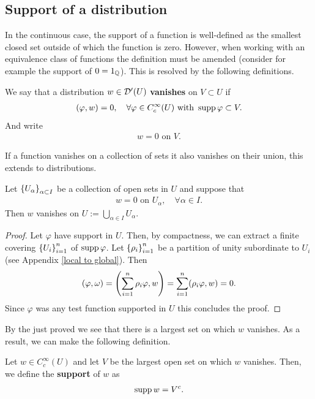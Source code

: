 \documentclass[
    a4paper,
    DIV=14,
    abstract=true,
    numbers=noenddot
]{scrartcl}
\begin{document}
\subsection{Support of a distribution}\label{support sec}
In the continuous case, the support of a function is well-defined as the smallest closed set outside of which the function is zero. However, when working with an equivalence class of functions the definition must be amended (consider for example the support of $0=1_{\mathbb{Q}}$). This is resolved by the following definitions.
\begin{definition} We say that a distribution $w \in \mathcal{D}'(U)$ \textbf{vanishes} on $V \subset U$ if
	\begin{align*}
		(\varphi, w)=0 , \quad\forall \varphi \in C_c^\infty(U) \text{ with } \operatorname{supp}{\varphi} \subset V  .
	\end{align*}
	And write
	\begin{align*}
		w =0 \text{ on } V.
	\end{align*}

\end{definition}
If a function vanishes on a collection of sets it also vanishes on their union, this extends to distributions.
\begin{lemma}\label{biggest vanish}
	Let  $\left\{U_\alpha\right\}_{\alpha \subset I} $ be a collection of open sets in $U$ and suppose that
	\begin{align*}
		w=0 \text{ on  } U_\alpha , \quad\forall \alpha \in I.
	\end{align*}
	Then $w$ vanishes on  $U:=\bigcup_{\alpha \in  I}U_\alpha$.
\end{lemma}
\begin{proof}
	Let $\varphi$ have support in $U$. Then,     by compactness, we can extract a finite covering $\left\{U_i\right\}_{i=1}^n $ of $\operatorname{supp}{\varphi} $. Let $\left\{\rho _i\right\}_{i=1}^n $ be a partition of unity  subordinate to $U_i$ (see Appendix \ref{local to global}). Then
	\begin{align*}
		(\varphi,\omega)=\left(\sum_{i=1}^n \rho _i \varphi,w \right)=\sum_{i=1}^n (\rho _i \varphi,w )=0 .
	\end{align*}
	Since $\varphi$ was any test function supported in $U$ this concludes the proof.
\end{proof}
By the just proved  we see that there is a largest set on which $w$ vanishes. As a result, we can make the following definition.
\begin{definition}\label{support def}
	Let $w \in C_c^\infty(U)$ and let  $V$ be the largest open set on which  $w$ vanishes. Then, we define the \textbf{support} of $w$ as
	\begin{align*}
		\operatorname{supp}{w}= V^c .
	\end{align*}
\end{definition}
\end{document}
